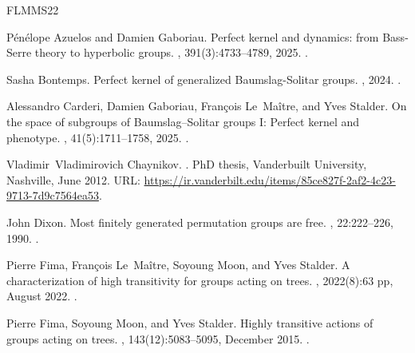 \documentclass[12pt]{article}
\numberwithin{equation}{section}
\theoremstyle{definition}
\begin{document}

%	 
\begin{thebibliography}{FLMMS22}

P\'{e}n\'{e}lope Azuelos and Damien Gaboriau.
\newblock Perfect kernel and dynamics: from {B}ass-{S}erre theory to hyperbolic
  groups.
, 391(3):4733--4789, 2025.
\newblock \href {https://doi.org/10.1007/s00208-024-03038-w}
  {}.

Sasha Bontemps.
\newblock Perfect kernel of generalized {{Baumslag-Solitar}} groups.
, 2024.
\newblock \href {https://doi.org/10.48550/arXiv.2411.03221}
  {}.

Alessandro Carderi, Damien Gaboriau, Fran{\c c}ois Le~Ma{\^i}tre, and Yves
  Stalder.
\newblock On the space of subgroups of {{Baumslag}}--{{Solitar}} groups {{I}}:
  {{Perfect}} kernel and phenotype.
, 41(5):1711--1758, 2025.
\newblock \href {https://doi.org/10.4171/rmi/1549}
  {}.

Vladimir~Vladimirovich Chaynikov.
.
\newblock PhD thesis, Vanderbuilt University, Nashville, June 2012.
\newblock URL:
  \url{https://ir.vanderbilt.edu/items/85ce827f-2af2-4c23-9713-7d9c7564ea53}.

John Dixon.
\newblock Most finitely generated permutation groups are free.
, 22:222--226, 1990.
\newblock \href {https://doi.org/10.1112/blms/22.3.222}
  {}.

Pierre Fima, François Le~Maître, Soyoung Moon, and Yves Stalder.
\newblock A characterization of high transitivity for groups acting on trees.
, 2022(8):63 pp, August 2022.
\newblock \href {https://doi.org/10.19086/da.37645}
  {}.

Pierre Fima, Soyoung Moon, and Yves Stalder.
\newblock Highly transitive actions of groups acting on trees.
,
  143(12):5083--5095, December 2015.
\newblock \href {https://doi.org/10.1090/proc/12659}
  {}.


\end{thebibliography}
\end{document}
